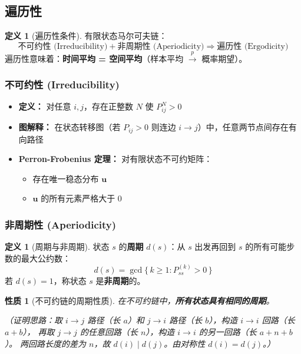 \documentclass[12pt,a4paper]{ctexart}
\newtheorem{property}[theorem]{性质}
\theoremstyle{definition}
\newtheorem{definition}[theorem]{定义}
\begin{document}
\subsection{遍历性}

\begin{definition}[遍历性条件]
有限状态马尔可夫链：
\[
\text{不可约性 (Irreducibility)} + \text{非周期性 (Aperiodicity)} \Rightarrow \text{遍历性 (Ergodicity)}
\]
遍历性意味着：\textbf{时间平均 = 空间平均}（样本平均 $\xrightarrow{p}$ 概率期望）。
\end{definition}

\subsubsection{不可约性 (Irreducibility)}

\begin{itemize}[nosep]
  \item \textbf{定义：} 对任意 $i,j$，存在正整数 $N$ 使 $P^N_{ij} > 0$
  \item \textbf{图解释：} 在状态转移图（若 $P_{ij}>0$ 则连边 $i\to j$）中，任意两节点间存在有向路径
  \item \textbf{Perron-Frobenius 定理：} 对有限状态不可约矩阵：
  \begin{itemize}[nosep]
    \item 存在唯一稳态分布 $\mathbf{u}$
    \item $\mathbf{u}$ 的所有元素严格大于 0
  \end{itemize}
\end{itemize}

\subsubsection{非周期性 (Aperiodicity)}

\begin{definition}[周期与非周期]
状态 $s$ 的\textbf{周期} $d(s)$：从 $s$ 出发再回到 $s$ 的所有可能步数的最大公约数：
\[
d(s) = \gcd\{\,k \geq 1 : P^{(k)}_{ss} > 0\,\}
\]
若 $d(s) = 1$，称状态 $s$ 是\textbf{非周期}的。
\end{definition}

\begin{property}[不可约链的周期性质]
在不可约链中，\textbf{所有状态具有相同的周期}。

（证明思路：取 $i\to j$ 路径（长 $a$）和 $j\to i$ 路径（长 $b$），构造 $i\to i$ 回路（长 $a+b$），
再取 $j\to j$ 的任意回路（长 $n$），构造 $i\to i$ 的另一回路（长 $a+n+b$）。
两回路长度的差为 $n$，故 $d(i) \mid d(j)$。由对称性 $d(i)=d(j)$。）
\end{property}
\end{document}

